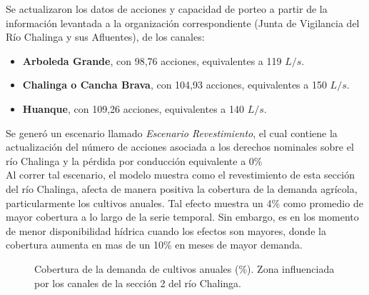 \documentclass[]{article}
\begin{document}
Se actualizaron los datos de acciones y capacidad de porteo a partir de la información levantada a la organización correspondiente (Junta de Vigilancia del Río Chalinga y sus Afluentes), de los canales:
\begin{itemize}

\item \textbf{Arboleda Grande}, con 98,76 acciones, equivalentes a 119 $L/s$.
\item \textbf{Chalinga o Cancha Brava}, con 104,93 acciones, equivalentes a 150 $L/s$.
\item \textbf{Huanque}, con 109,26 acciones, equivalentes a 140 $L/s$.\\

\end{itemize}

Se generó un escenario llamado \textit{Escenario Revestimiento}, el cual contiene la actualización del número de acciones asociada a los derechos nominales sobre el río Chalinga
y la pérdida por conducción equivalente a 0\% \\

Al correr tal escenario, el modelo muestra como el revestimiento de esta sección del río Chalinga, afecta de manera positiva la cobertura de la demanda agrícola, particularmente los cultivos anuales. Tal efecto muestra un 4\% como promedio de mayor cobertura a lo largo de la serie temporal. Sin embargo, es en los momento de menor disponibilidad hídrica cuando los efectos son mayores, donde la cobertura aumenta en mas de un 10\% en meses de mayor demanda.

\begin{figure}[H]
\begin{center}
\caption{Cobertura de la demanda de cultivos anuales (\%). Zona influenciada por los canales de la sección 2 del río Chalinga.}
\label{etiqueta_figura9}
\end{center}
\end{figure}
\end{document}
